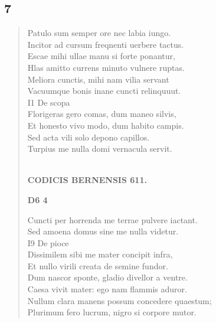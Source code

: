 \documentclass[11pt, a4paper]{report}
\begin{document}
            \subsection*{7}
      \begin{verse}
      Patulo sum semper ore nec labia iungo. \\ Incitor ad cursum freqnenti uerbere tactus. \\ Escae mihi ullae manu si forte ponantur, \\ Hlas amitto currens minuto vulnere ruptas. \\ Meliora cunctis, mihi nam vilia servant \\ Vacuumque bonis inane cuncti relinquuut. \\ I1 De scopa \\ Florigeras gero comas, dum maneo silvis, \\ Et honesto vivo modo, dum habito campis. \\ Sed acta vili solo depono capillos. \\ Turpius me nulla domi vernacula servit. \\ 
        ﻿\pagebreak 
    \begin{center} \textbf{CODICIS BERNENSIS 611.} \end{center}\begin{center} \textbf{D6 4} \end{center}Cuncti per horrenda me terrae pulvere iactant. \\ Sed amoena domus sine me nulla videtur. \\ I9 De pioce \\ Dissimilem sibi me mater concipit infra, \\ Et nullo virili creata de semine fundor. \\ Dum nascor sponte, gladio divellor a ventre. \\ Caesa vivit mater: ego nam flammis aduror. \\ Nullum clara manens possum concedere quaestum; \\ Plurimum fero lucrum, nigro si corpore mutor. \\ 
      \end{verse}
  
\end{document}
